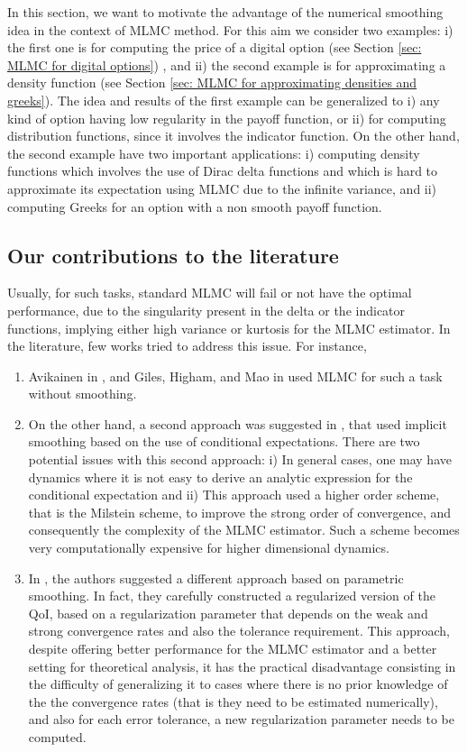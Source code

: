 In this section, we want to motivate the advantage of the numerical smoothing idea in the context of MLMC method. For this aim we consider two examples: i) the first one is for computing the price of a digital option (see Section \ref{sec: MLMC for digital options}) , and ii) the second example is for approximating a density function (see Section \ref{sec: MLMC for approximating densities and greeks}). The idea and results of the first example can be generalized to i)  any kind of option having low regularity in the payoff function, or  ii) for computing distribution functions, since it involves the indicator function.  On the other hand, the second example have two important applications: i) computing density functions which involves the use of Dirac delta functions and which is hard to approximate its expectation using MLMC due to the infinite variance, and ii) computing Greeks for an option with a non smooth payoff function.
\subsection{Our contributions to the literature}
Usually, for such  tasks, standard MLMC will fail or not have the optimal performance, due to the singularity present in the delta or the indicator functions, implying either high variance or kurtosis for the MLMC estimator. In the literature, few works tried to address this issue. For instance,
\begin{enumerate}
\item Avikainen in \cite{avikainen2009irregular}, and Giles, Higham, and Mao in \cite{giles2009analysing} used MLMC for such a task without smoothing.
\item On the other hand, a second approach  was suggested in  \cite{giles2008improved,giles2013numerical}, that used implicit smoothing based on the use of conditional expectations. There are two potential issues  with this second approach: i) In general cases, one may have dynamics where it is not easy to derive an  analytic expression for the conditional expectation and ii) This approach used a higher order scheme, that is the Milstein scheme, to improve the strong order of convergence, and consequently the complexity of the MLMC estimator. Such a scheme becomes very computationally expensive for higher dimensional dynamics.
\item In \cite{giles2015multilevel}, the authors suggested a different approach based on parametric smoothing.  In fact, they carefully constructed a regularized version of the QoI, based on a 
regularization parameter that depends on the weak and strong convergence rates and also  the tolerance requirement.  This approach, despite offering better performance for the MLMC estimator and a better setting for theoretical analysis, it has the practical disadvantage consisting in the difficulty of generalizing it to cases where there is no prior knowledge of the the convergence rates (that is they need to be estimated numerically), and also for each error tolerance, a new  regularization parameter needs to be computed.
\end{enumerate}    

